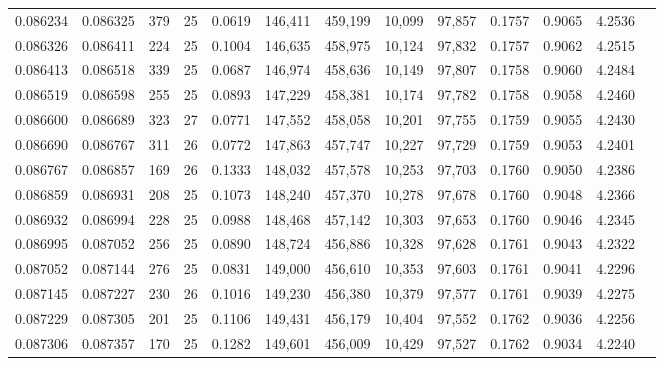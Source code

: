 \begin{tabular}{rrrrrrrrrrrrr}
0.086234 & 0.086325 & 379 &  25 &                                     0.0619 & 146,411 & 459,199 &  10,099 &  97,857 & 0.1757 & 0.9065 & 4.2536 \\
0.086326 & 0.086411 & 224 &  25 &                                     0.1004 & 146,635 & 458,975 &  10,124 &  97,832 & 0.1757 & 0.9062 & 4.2515 \\
0.086413 & 0.086518 & 339 &  25 &                                     0.0687 & 146,974 & 458,636 &  10,149 &  97,807 & 0.1758 & 0.9060 & 4.2484 \\
0.086519 & 0.086598 & 255 &  25 &                                     0.0893 & 147,229 & 458,381 &  10,174 &  97,782 & 0.1758 & 0.9058 & 4.2460 \\
0.086600 & 0.086689 & 323 &  27 &                                     0.0771 & 147,552 & 458,058 &  10,201 &  97,755 & 0.1759 & 0.9055 & 4.2430 \\
0.086690 & 0.086767 & 311 &  26 &                                     0.0772 & 147,863 & 457,747 &  10,227 &  97,729 & 0.1759 & 0.9053 & 4.2401 \\
0.086767 & 0.086857 & 169 &  26 &                                     0.1333 & 148,032 & 457,578 &  10,253 &  97,703 & 0.1760 & 0.9050 & 4.2386 \\
0.086859 & 0.086931 & 208 &  25 &                                     0.1073 & 148,240 & 457,370 &  10,278 &  97,678 & 0.1760 & 0.9048 & 4.2366 \\
0.086932 & 0.086994 & 228 &  25 &                                     0.0988 & 148,468 & 457,142 &  10,303 &  97,653 & 0.1760 & 0.9046 & 4.2345 \\
0.086995 & 0.087052 & 256 &  25 &                                     0.0890 & 148,724 & 456,886 &  10,328 &  97,628 & 0.1761 & 0.9043 & 4.2322 \\
0.087052 & 0.087144 & 276 &  25 &                                     0.0831 & 149,000 & 456,610 &  10,353 &  97,603 & 0.1761 & 0.9041 & 4.2296 \\
0.087145 & 0.087227 & 230 &  26 &                                     0.1016 & 149,230 & 456,380 &  10,379 &  97,577 & 0.1761 & 0.9039 & 4.2275 \\
0.087229 & 0.087305 & 201 &  25 &                                     0.1106 & 149,431 & 456,179 &  10,404 &  97,552 & 0.1762 & 0.9036 & 4.2256 \\
0.087306 & 0.087357 & 170 &  25 &                                     0.1282 & 149,601 & 456,009 &  10,429 &  97,527 & 0.1762 & 0.9034 & 4.2240 \\

\end{tabular}
